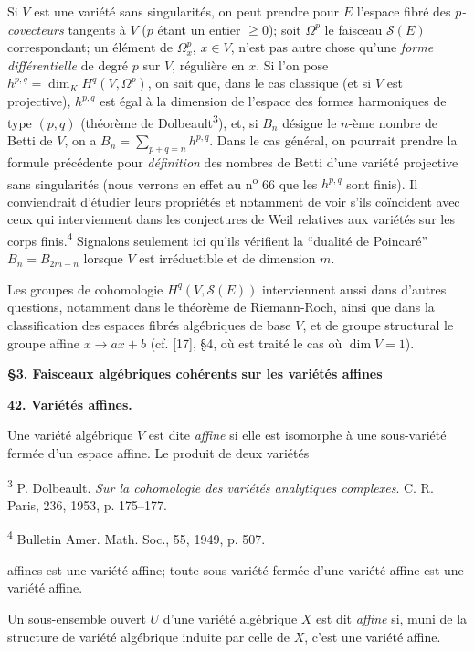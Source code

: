 Si $V$ est une variété sans singularités, on peut prendre pour $E$ l'espace fibré des \textit{$p$-covecteurs} tangents à $V$ ($p$ étant un entier $\geqq 0$); soit $\Omega^p$ le faisceau $\mathcal{S}(E)$ correspondant; un élément de $\Omega_x^p$, $x \in V$, n'est pas autre chose qu'une \textit{forme différentielle} de degré $p$ sur $V$, régulière en $x$. Si l'on pose $h^{p,q} = \dim_K H^q(V, \Omega^p)$, on sait que, dans le cas classique (et si $V$ est projective), $h^{p,q}$ est égal à la dimension de l'espace des formes harmoniques de type $(p, q)$ (théorème de Dolbeault\textsuperscript{3}), et, si $B_n$ désigne le $n$-ème nombre de Betti de $V$, on a $B_n = \sum_{p+q=n} h^{p,q}$. Dans le cas général, on pourrait prendre la formule précédente pour \textit{définition} des nombres de Betti d'une variété projective sans singularités (nous verrons en effet au n\textsuperscript{o} 66 que les $h^{p,q}$ sont finis). Il conviendrait d'étudier leurs propriétés et notamment de voir s'ils coïncident avec ceux qui interviennent dans les conjectures de Weil relatives aux variétés sur les corps finis.\textsuperscript{4} Signalons seulement ici qu'ils vérifient la ``dualité de Poincaré'' $B_n = B_{2m-n}$ lorsque $V$ est irréductible et de dimension $m$.

Les groupes de cohomologie $H^q(V, \mathcal{S}(E))$ interviennent aussi dans d'autres questions, notamment dans le théorème de Riemann-Roch, ainsi que dans la classification des espaces fibrés algébriques de base $V$, et de groupe structural le groupe affine $x \rightarrow ax + b$ (cf. [17], §4, où est traité le cas où $\dim V = 1$).


\textbf{§3. Faisceaux algébriques cohérents sur les variétés affines}


\textbf{42. Variétés affines.}

Une variété algébrique $V$ est dite \textit{affine} si elle est isomorphe à une sous-variété fermée d'un espace affine. Le produit de deux variétés 

\textsuperscript{3} P. Dolbeault. \textit{Sur la cohomologie des variétés analytiques complexes}. C. R. Paris, 236, 1953, p. 175--177.

\textsuperscript{4} Bulletin Amer. Math. Soc., 55, 1949, p. 507.



 affines est une variété affine; toute sous-variété fermée d'une variété affine est une variété affine.

Un sous-ensemble ouvert $U$ d'une variété algébrique $X$ est dit \textit{affine} si, muni de la structure de variété algébrique induite par celle de $X$, c'est une variété affine.

